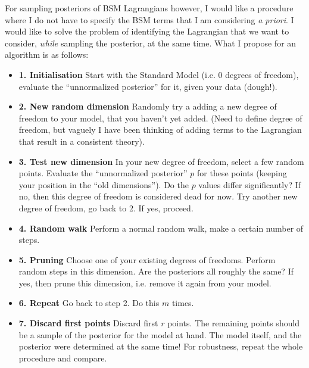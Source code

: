 \documentclass[11pt,singleside,a4paper,makeidx,notitlepage]{article}
\begin{document}
For sampling posteriors of BSM Lagrangians however, I would like a procedure
where I do not have to specify the BSM terms that I am considering {\it a
priori}. I would like to solve the problem of identifying the Lagrangian
that we want to consider, {\it while} sampling the posterior, at the same
time. What I propose for an algorithm is as follows:

\begin{itemize}
 \item {\bf 1. Initialisation} Start with the Standard Model (i.e. 0 degrees of freedom), evaluate
the ``unnormalized posterior'' for it, given your data (dough!).
 \item {\bf 2. New random dimension} Randomly try a adding a new degree of freedom to your model, that 
you haven't yet added. (Need to define degree of freedom, but vaguely I have
been thinking of adding terms to the Lagrangian that result in a consistent theory).
 \item {\bf 3. Test new dimension} In your new degree of freedom, select a few random points. Evaluate
the ``unnormalized posterior'' $p$ for these points (keeping your position in
the ``old dimensions''). Do the $p$ values differ
significantly? If no, then this degree of freedom is considered dead for now.
Try another new degree of freedom, go back to 2. If yes, proceed.
 \item {\bf 4. Random walk} Perform a normal random walk, make a certain
number of steps. 
 \item {\bf 5. Pruning} Choose one of your existing degrees of freedoms.
Perform random steps in this dimension. Are the posteriors all roughly the
same? If yes, then prune this dimension, i.e. remove it again from your model.
 \item {\bf 6. Repeat} Go back to step 2. Do this $m$ times. 
 \item {\bf 7. Discard first points} Discard first $r$ points. The remaining
points should be a sample of the posterior for the model at hand. The model
itself, and the posterior were determined at the same time! For robustness,
repeat the whole procedure and compare.
\end{itemize}
\end{document}
